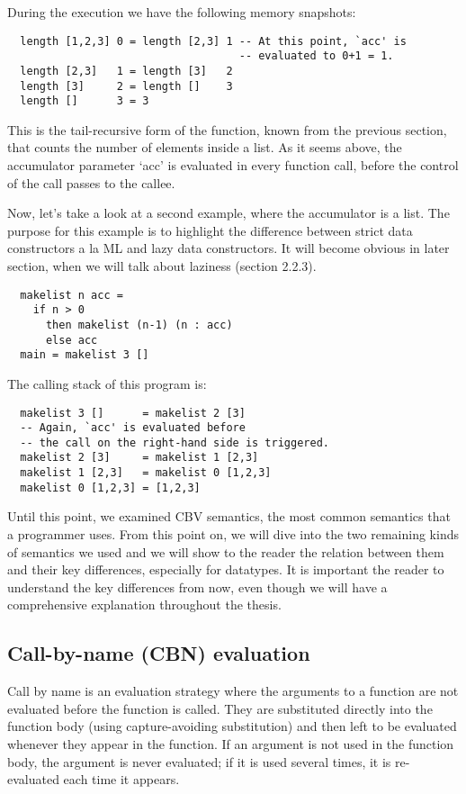 \documentclass[diploma]{softlab-thesis}
\begin{document}
During the execution we have the following memory snapshots:
\begin{verbatim}
  length [1,2,3] 0 = length [2,3] 1 -- At this point, `acc' is 
                                    -- evaluated to 0+1 = 1.
  length [2,3]   1 = length [3]   2
  length [3]     2 = length []    3
  length []      3 = 3
\end{verbatim}

This is the tail-recursive form of the function, known from the previous section, that counts the number 
of elements inside a list. As it seems above, the accumulator parameter `acc' is evaluated in every 
function call, before the control of the call passes to the callee.
\newline
\par Now, let's take a look at a second example, where the accumulator is a list. The purpose for this 
example is to highlight the difference between strict data constructors a la ML and lazy data constructors.
It will become obvious in later section, when we will talk about laziness (section 2.2.3).

\begin{verbatim}
  makelist n acc = 
    if n > 0 
      then makelist (n-1) (n : acc)
      else acc
  main = makelist 3 []
\end{verbatim}

The calling stack of this program is:
\begin{verbatim}
  makelist 3 []      = makelist 2 [3] 
  -- Again, `acc' is evaluated before 
  -- the call on the right-hand side is triggered.
  makelist 2 [3]     = makelist 1 [2,3]
  makelist 1 [2,3]   = makelist 0 [1,2,3]
  makelist 0 [1,2,3] = [1,2,3]
\end{verbatim}

Until this point, we examined CBV semantics, the most common 
semantics that a programmer uses. From this point on, we will dive into 
the two remaining kinds of semantics we used and we will show to the reader 
the relation between them and their key differences, especially for datatypes.
It is important the reader to understand the key differences from now, even though 
we will have a comprehensive explanation throughout the thesis.

\subsection {Call-by-name (CBN) evaluation}
Call by name is an evaluation strategy where the arguments to a function are not evaluated before the function is called. 
They are substituted directly into the function body (using capture-avoiding substitution) and then left to be evaluated 
whenever they appear in the function. If an argument is not used in the function body, the argument is never evaluated; 
if it is used several times, it is re-evaluated each time it appears.
\end{document}
